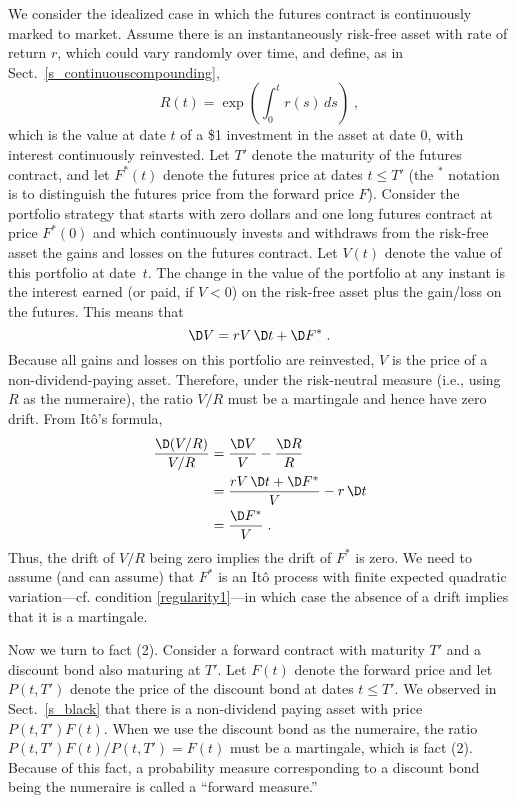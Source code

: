 We consider the idealized case in which the futures contract is continuously marked to market.  Assume there is an instantaneously risk-free asset with rate of return $r$, which could vary randomly over time, and define, as in Sect.~\ref{s_continuouscompounding},
$$R(t) = \exp\left(\int_0^t r(s)\,ds\right)\; ,$$
which is the value at date $t$ of a \$1 investment in the asset at date 0, with interest continuously reinvested.
Let $T'$ denote the maturity of the futures contract, and let $F^*(t)$ denote the futures price at dates $t \leq T'$ (the $^*$ notation is to distinguish the futures price from the forward price $F$).
Consider the portfolio strategy that starts with zero dollars and one long futures contract at price $F^*(0)$ and which continuously invests and withdraws from the risk-free asset the gains and losses on the futures contract.  Let $V(t)$ denote the value of this portfolio at date~$t$.  The change in the value of the portfolio at any instant is the interest earned (or paid, if $V<0$) on the risk-free asset plus the gain/loss on the futures.  This means that
$$\D V = rV\,\D t + \D F^*\; .$$
Because all gains and losses on this portfolio are reinvested, $V$ is the price of a non-dividend-paying asset.  Therefore, under the risk-neutral measure (i.e., using $R$ as the numeraire), the ratio $V/R$ must be a martingale and hence have zero drift.  From It\^o's formula,
\begin{align*}
\frac{\D (V/R)}{V/R} &= \frac{\D V}{V} - \frac{\D R}{R}\\
&=\frac{rV\,\D t + \D F^*}{V} - r\,\D t\\
&= \frac{\D F^*}{V}\;.
\end{align*}
Thus, the drift of $V/R$ being zero implies the drift of $F^*$ is zero.  We need to assume (and can assume) that $F^*$ is an It\^o process with finite expected quadratic variation---cf. condition \eqref{regularity1}---in which case the absence
of a drift implies that it is a martingale.  

Now we turn to fact (2).  Consider a forward contract with maturity $T'$ and a discount bond also maturing at $T'$.  Let $F(t)$ denote the forward price and let $P(t,T')$ denote the price of the discount bond at dates $t \leq T'$.  We observed in Sect.~\ref{s_black} that there is a non-dividend paying asset with price $P(t,T')F(t)$.  When we use the discount bond as the numeraire, the ratio $P(t,T')F(t)/P(t,T') = F(t)$ must be a martingale, which is fact (2).  Because of this fact, a probability measure  corresponding to a discount bond being the numeraire is called a ``forward measure.'' 

